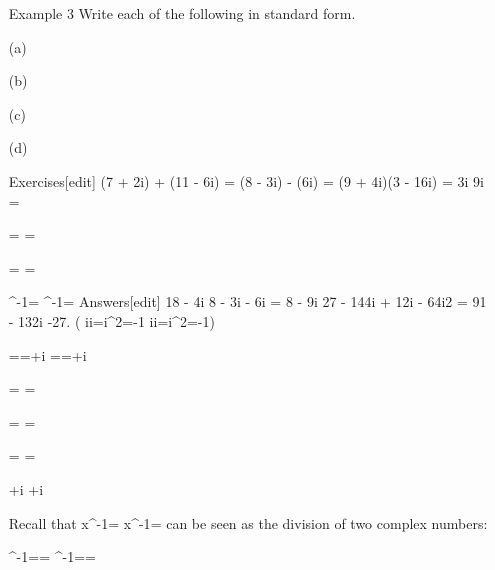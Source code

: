 \begin{enumerate}
Example 3  Write each of the following in standard form.
\item[(a)]    
\item[(b)]    
\item[(c)]    
\item[(d)]    


Exercises[edit]
(7 + 2i) + (11 - 6i) =
(8 - 3i) - (6i) =
(9 + 4i)(3 - 16i) =
3i {\displaystyle \times } \times  9i =

{=} {=}

{=} {=}

{^{-1}=} {^{-1}=}
Answers[edit]
18 - 4i
8 - 3i - 6i = 8 - 9i
27 - 144i + 12i - 64i2 = 91 - 132i
-27. ( {\displaystyle i\times i=i^{2}=-1} {\displaystyle i\times i=i^{2}=-1})

{={}={}+{}i} {={}={}+{}i}

{=} {=}

{=} {=}

{=} {=}

{+{}i} {+{}i}


Recall that {\displaystyle x^{-1}={}} {\displaystyle x^{-1}={}} can be seen as the division of two complex numbers:

{^{-1}={}=} {^{-1}={}=}


\end{enumerate}
